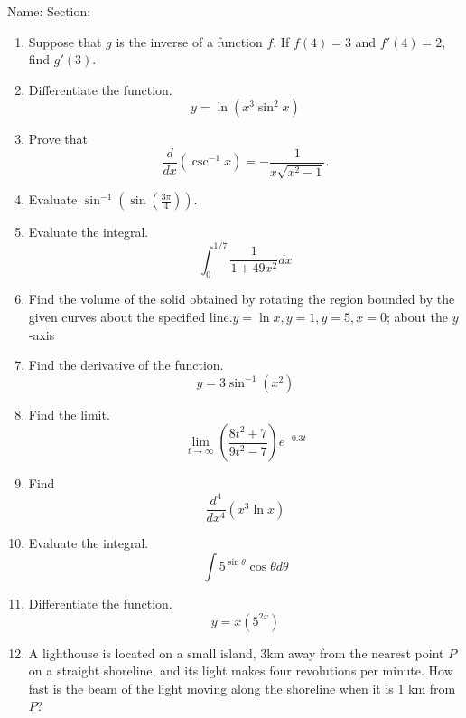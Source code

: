 \documentclass[12pt]{article}
\begin{document}
\noindent Name: \hspace{4in}Section:
\vspace{0.5cm}



\begin{enumerate}
\item Suppose that $g$ is the inverse of a function $f$. If $f(4)=3$ and $f'(4)=2$, find $g'(3).$ \vfill



\item Differentiate the function. \[y= \ln\left(x^3 \sin^2{x}
\right)\] 
\vfill
\item Prove that \[\frac{d}{dx}\left(\csc^{-1}x\right)=-\frac{1}{x\sqrt{x^2-1}}. \]
\vfill
\newpage


\item Evaluate $\sin^{-1}\left( \sin \left(\frac{3\pi}{4}\right)\right)$.
\vfill

 

\item
Evaluate the integral. \[\int_0^{1/7} \frac{1}{1+49x^2}dx\]

\vfill
\item Find the volume of the solid obtained by rotating the region bounded by the given curves about the specified line.$y=\ln x, y=1, y=5, x=0$; about the $y$-axis
\vfill
\newpage
\item Find the derivative of the function.
\[y=3 \sin^{-1}\left(x^2\right)\]
\vfill

\item Find the limit.
\[\lim_{t \to \infty} \left(\frac{8t^2+7}{9t^2-7}\right)e^{-0.3t}\]
\vfill
\item Find \[\frac{d^4}{dx^4}\left( x^3 \ln x\right)\]
\vfill
\newpage
\item Evaluate the integral.
\[\int 5^{\sin \theta}\cos \theta d\theta\]
\vfill
\item Differentiate the function.\[y=x\left( 5^{2x} \right)\]
\vfill
\item A lighthouse is located on a small island, 3km away from the nearest point $P$ on a straight shoreline, and its light makes four revolutions per minute. How fast is the beam of the light moving along the shoreline when it is 1 km from $P$? 
\vfill
\end{enumerate}
\end{document}
